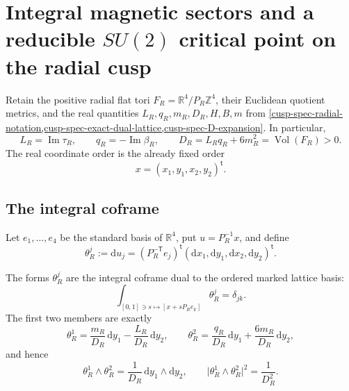 
\section{Integral magnetic sectors and a reducible
\texorpdfstring{\(SU(2)\)}{SU(2)} critical point on the radial cusp}
\label{cusp-magnetic-section}

Retain the positive radial flat tori
\(F_R=\mathbb R^4/P_R\mathbb Z^4\), their Euclidean quotient metrics, and
the real quantities \(L_R,q_R,m_R,D_R,H,B,m\) from
\cref{cusp-spec-radial-notation,cusp-spec-exact-dual-lattice,cusp-spec-D-expansion}.
In particular,
\[
 L_R=\operatorname{Im}\tau_R,\qquad
 q_R=-\operatorname{Im}\beta_R,\qquad
 D_R=L_Rq_R+6m_R^2=\operatorname{Vol}(F_R)>0.
\]
The real coordinate order is the already fixed order
\[
 x=(x_1,y_1,x_2,y_2)^{\mathsf t}.
\]

\subsection{The integral coframe}

Let \(e_1,\ldots,e_4\) be the standard basis of \(\mathbb R^4\), put
\(u=P_R^{-1}x\), and define
\begin{equation}
 \theta_R^j:=\mathrm du_j
 =(P_R^{-\mathsf T}e_j)^{\mathsf t}
   (\mathrm dx_1,\mathrm dy_1,\mathrm dx_2,\mathrm dy_2)^{\mathsf t}.
 \label{cusp-magnetic-integral-coframe}
\end{equation}

\begin{proposition}
\label{cusp-magnetic-coframe-proposition}
The forms \(\theta_R^j\) are the integral coframe dual to the ordered
marked lattice basis:
\[
 \int_{[0,1]\ni s\mapsto[x+sP_Re_k]}\theta_R^j=\delta_{jk}.
\]
The first two members are exactly
\begin{equation}
 \theta_R^1=\frac{m_R}{D_R}\,\mathrm dy_1
             -\frac{L_R}{D_R}\,\mathrm dy_2,
 \qquad
 \theta_R^2=\frac{q_R}{D_R}\,\mathrm dy_1
             +\frac{6m_R}{D_R}\,\mathrm dy_2,
 \label{cusp-magnetic-first-two-covectors}
\end{equation}
and hence
\begin{equation}
 \theta_R^1\wedge\theta_R^2
 =\frac1{D_R}\,\mathrm dy_1\wedge\mathrm dy_2,
 \qquad
 \lvert\theta_R^1\wedge\theta_R^2\rvert^2
 =\frac1{D_R^2}.
 \label{cusp-magnetic-wedge-norm}
\end{equation}
\end{proposition}

